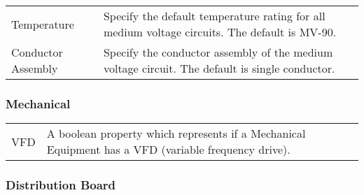 \documentclass[letterpaper,10pt,english]{sphinxmanual}
\begin{document}
\begin{savenotes}\sphinxattablestart
\centering
\begin{tabulary}{\linewidth}[t]{|T|T|}
\hline
\sphinxstyletheadfamily 
{}
&\sphinxstyletheadfamily 
{}
\\
\hline
Temperature
&
Specify the default temperature rating for all medium voltage circuits.  The default is MV-90.
\\
\hline
Conductor Assembly
&
Specify the conductor assembly of the medium voltage circuit.  The default is single conductor.
\\
\hline
\end{tabulary}
\par
\sphinxattableend\end{savenotes}


\subsubsection{Mechanical}
\label{\detokenize{docs/definitions/index-definitions:mechanical}}

\begin{savenotes}\sphinxattablestart
\centering
\begin{tabulary}{\linewidth}[t]{|T|T|}
\hline
\sphinxstyletheadfamily 
{}
&\sphinxstyletheadfamily 
{}
\\
\hline
VFD
&
A boolean property which represents if a Mechanical Equipment has a VFD (variable frequency drive).
\\
\hline
\end{tabulary}
\par
\sphinxattableend\end{savenotes}


\subsubsection{Distribution Board}
\label{\detokenize{docs/definitions/index-definitions:distribution-board}}
\end{document}
